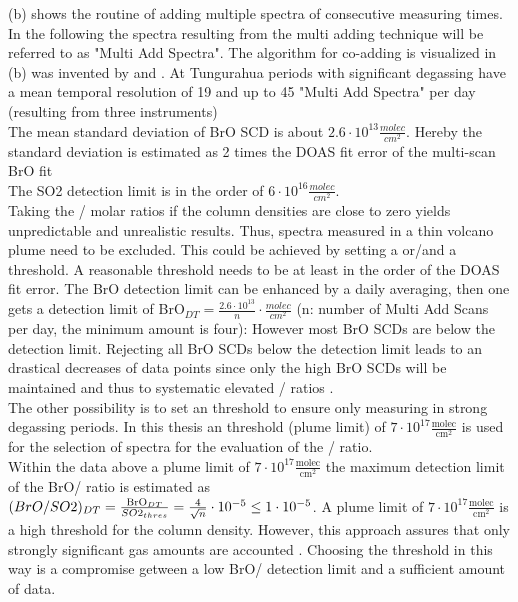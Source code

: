  (b) shows the routine of adding multiple spectra of consecutive measuring times. In the following the spectra resulting from the multi adding technique will be referred to as "Multi Add Spectra". The algorithm for co-adding is visualized in  (b) was invented by \citet{vogel2011volcanic} and \citet{lubcke2014bro}. At Tungurahua periods with significant degassing have a mean temporal resolution of 19 and up to 45 "Multi Add Spectra" per day (resulting from three instruments)\\

The mean standard deviation of BrO SCD is about $2.6\cdot10^{13} \frac{molec}{cm^{2}}$. Hereby the standard deviation is estimated as 2 times the DOAS fit error of the multi-scan BrO fit \citet{Stutz96} \\
%
The SO2    detection limit is in the order of $6\cdot10^{16}\frac{molec}{cm^{2}}$.\\
%
Taking the / molar ratios if the column densities are close to zero yields unpredictable and unrealistic results. 
Thus, spectra measured in a thin volcano plume need to be excluded.
This could be achieved by setting a  or/and a  threshold. A reasonable  threshold needs to be at least in the order of the DOAS fit error. The BrO detection limit can be enhanced by a daily averaging, then one gets a detection limit of BrO$_{DT}=\frac{2.6\cdot10^{13}}{n}\cdot\frac{molec}{cm^{2}}$ (n: number of Multi Add Scans per day, the minimum amount is four): However most BrO SCDs are below the detection limit.
Rejecting all BrO SCDs below the detection limit leads to an drastical decreases of data points since only the high BrO SCDs will be maintained and thus to systematic elevated / ratios  \citep{lubcke2014bro}.\\
%
The other possibility is to set an  threshold to ensure only measuring in strong degassing periods. In this thesis an  threshold (plume limit) of $7\cdot 10^{17} \frac{\text{molec}}{\text{cm}^2}$ is used for the selection of spectra for the evaluation of the / ratio. \\
%
Within the data above a  plume limit of $7\cdot 10^{17} \frac{\text{molec}}{\text{cm}^2}$ the maximum detection limit of the BrO/ ratio is estimated as $(BrO/SO2)_{DT}    =    \frac{\ce{BrO}_{DT}}{SO2_{thres}}=\frac{4    }{\sqrt{n}}\cdot10^{-5}     \leq     1\cdot10^{-5}$.
A plume limit of $7\cdot 10^{17} \frac{\text{molec}}{\text{cm}^2}$ is a high threshold for the column density. However, this approach assures that only strongly significant gas amounts are accounted \citep{lubcke2014bro}. Choosing the  threshold in this way is a compromise getween a low BrO/ detection limit and a sufficient amount of data.\\
